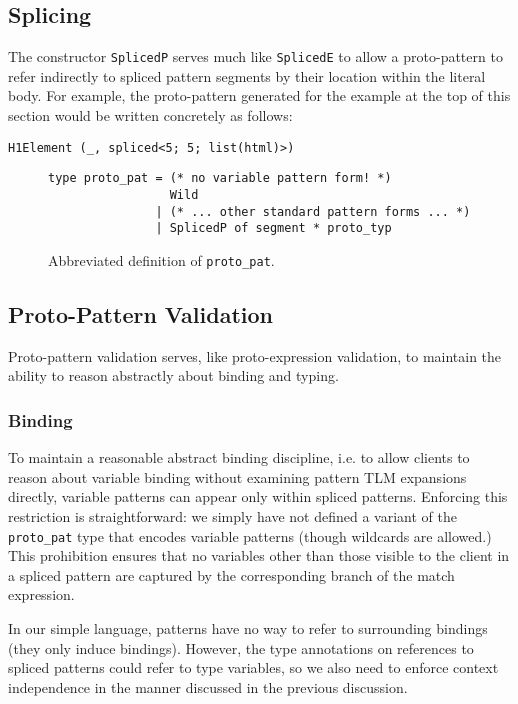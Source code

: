 \documentclass[acmsmall,10pt,review,anonymous]{acmart}\settopmatter{printfolios=true}
\newcommand{\li}[1]{\lstinline{#1}}
\begin{document}
\subsection{Splicing}
The constructor \li{SplicedP} serves much like \li{SplicedE} to allow a proto-pattern to refer indirectly to spliced pattern segments by their location within the literal body. For example, the proto-pattern generated for the example at the top of this section would be written concretely as follows:
\begin{lstlisting}[numbers=none]
  H1Element (_, spliced<5; 5; list(html)>)
\end{lstlisting}

\begin{figure}
\begin{lstlisting}[numbers=none]
type proto_pat = (* no variable pattern form! *) 
                 Wild
               | (* ... other standard pattern forms ... *)
               | SplicedP of segment * proto_typ
\end{lstlisting}
\vspace{-5px}
\caption[Abbreviated definition of \li{proto_pat} in VerseML]{Abbreviated definition of \li{proto_pat}.}
\label{fig:CEPat}
\end{figure}

\subsection{Proto-Pattern Validation}
Proto-pattern validation serves, like proto-expression validation, to maintain the ability to reason abstractly about binding and typing. 

\subsubsection{Binding} To maintain a reasonable abstract binding discipline, i.e. to allow clients to reason about variable binding without examining pattern TLM expansions directly, variable patterns can appear only within spliced patterns. Enforcing this restriction is straightforward: we simply have not defined a variant of the \li{proto_pat} type that encodes variable patterns (though wildcards are allowed.)  This prohibition ensures that no variables other than those visible to the client in a spliced pattern are captured by the corresponding branch of the match expression.

In our simple language, patterns have no way to refer to surrounding bindings (they only induce bindings). However, the type annotations on references to spliced patterns could refer to type variables, so we also need to enforce context independence in the manner discussed in the previous discussion.
\end{document}
